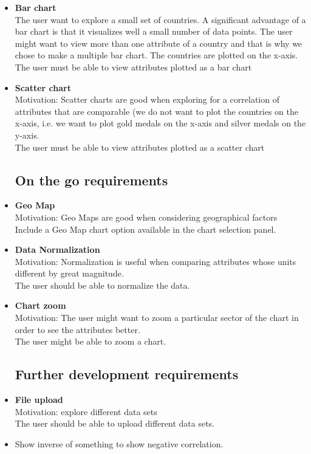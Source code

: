 \documentclass[a4paper]{article}
\begin{document}
\begin{itemize}
\item{\textbf{Bar chart}\\The user want to explore a small set of countries. A significant advantage of a bar chart is that it visualizes well a small number of data points. The user might want to view more than one attribute of a country and that is why we chose to make a multiple bar chart. The countries are plotted on the x-axis.\\The user must be able to view attributes plotted as a bar chart}
\item{\textbf{Scatter chart}\\Motivation: Scatter charts are good when exploring for a correlation of attributes that are comparable (we do not want to plot the countries on the x-axis, i.e. we want to plot gold medals on the x-axis and silver medals on the y-axis.\\The user must be able to view attributes plotted as a scatter chart}

\subsection{On the go requirements}
\item{\textbf{Geo Map}\\Motivation: Geo Maps are good when considering geographical factors\\Include a Geo Map chart option available in the chart selection panel.}
\item{\textbf{Data Normalization}\\Motivation: Normalization is useful when comparing attributes whose units different by great magnitude.\\The user should be able to normalize the data.}
\item{\textbf{Chart zoom}\\Motivation: The user might want to zoom a particular sector of the chart in order to see the attributes better.\\The user might be able to zoom a chart.}

\subsection{Further development requirements}
\item{\textbf{File upload}\\Motivation: explore different data sets\\The user should be able to upload different data sets.}
\item{Show inverse of something to show negative correlation.}

\end{itemize}
\end{document}

